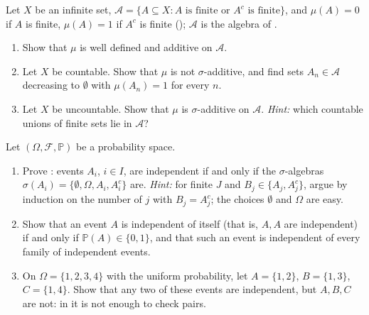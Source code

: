 \begin{exercise}\label{ex:ms-cofinite-zero-one}
\medium Let $X$ be an infinite set,
$\mathcal A=\{A\subseteq X:A\text{ is finite or }A^c\text{ is finite}\}$, and $\mu(A)=0$ if $A$
is finite, $\mu(A)=1$ if $A^c$ is finite (); $\mathcal A$ is
the algebra of .
\begin{enumerate}[label=(\alph*)]
  \item Show that $\mu$ is well defined and additive on $\mathcal A$.
  \item Let $X$ be countable. Show that $\mu$ is not $\sigma$-additive, and find sets
    $A_n\in\mathcal A$ decreasing to $\emptyset$ with $\mu(A_n)=1$ for every $n$.
  \item Let $X$ be uncountable. Show that $\mu$ is $\sigma$-additive on $\mathcal A$.
    \emph{Hint:} which countable unions of finite sets lie in $\mathcal A$?
\end{enumerate}
\end{exercise}

\begin{exercise}\label{ex:ms-independence-sigma}
\medium Let $(\Omega,\mathcal F,\mathbb P)$ be a probability space.
\begin{enumerate}[label=(\alph*)]
  \item Prove : events $A_i$, $i\in I$, are
    independent if and only if the $\sigma$-algebras $\sigma(A_i)=\{\emptyset,\Omega,A_i,A_i^c\}$
    are. \emph{Hint:} for finite $J$ and $B_j\in\{A_j,A_j^c\}$, argue by induction on the
    number of $j$ with $B_j=A_j^c$; the choices $\emptyset$ and $\Omega$ are easy.
  \item Show that an event $A$ is independent of itself (that is, $A,A$ are independent) if
    and only if $\mathbb P(A)\in\{0,1\}$, and that such an event is independent of every
    family of independent events.
  \item On $\Omega=\{1,2,3,4\}$ with the uniform probability, let $A=\{1,2\}$, $B=\{1,3\}$,
    $C=\{1,4\}$. Show that any two of these events are independent, but $A,B,C$ are not: in
     it is not enough to check pairs.
\end{enumerate}
\end{exercise}


